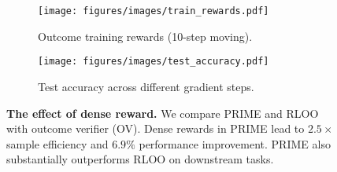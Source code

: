 \begin{figure*}[t]
    \centering
    \begin{subfigure}{0.42\textwidth}
        \centering
        \texttt{[image: figures/images/train\_rewards.pdf]}
        \caption{Outcome training rewards (10-step moving).} %
    \end{subfigure}
    \hfill %
    \begin{subfigure}{0.57\textwidth}
        \centering
        \texttt{[image: figures/images/test\_accuracy.pdf]}
        \caption{Test accuracy across different gradient steps.} %
    \end{subfigure}
    \caption{
    \textbf{The effect of dense reward.} We compare PRIME and RLOO with outcome verifier (OV). Dense rewards in PRIME lead to \textbf{$2.5\times$} sample efficiency and \textbf{$6.9\%$} performance improvement. PRIME also substantially outperforms RLOO on downstream tasks.} %
    \label{fig:dense_rewards}
    \vspace{-10pt}
\end{figure*}



